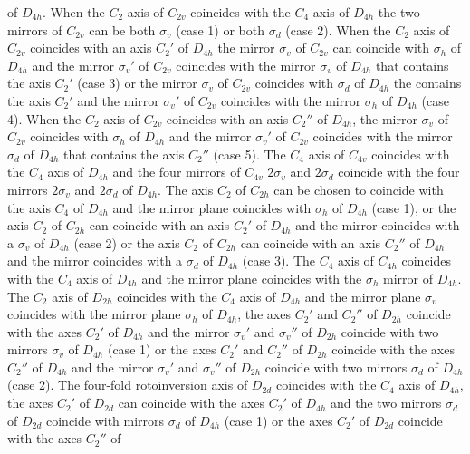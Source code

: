 \documentclass[12pt,a4paper]{article}
\begin{document}
of $D_{4h}$.
When the $C_2$ axis of $C_{2v}$ coincides with the $C_4$ axis
of $D_{4h}$ the two mirrors of $C_{2v}$ can be both $\sigma_v$ (case 1) or 
both $\sigma_d$ (case 2). When the $C_2$ axis of $C_{2v}$ coincides with an axis 
$C_2'$ of $D_{4h}$ the mirror $\sigma_v$ of $C_{2v}$ can coincide with $\sigma_h$ of
$D_{4h}$ and the mirror $\sigma_v'$ of $C_{2v}$ coincides with the mirror
$\sigma_v$ of $D_{4h}$ that contains the axis $C_2'$ (case 3) or the mirror
$\sigma_v$ of $C_{2v}$ coincides with $\sigma_d$ of
$D_{4h}$ the contains the axis $C_2'$ and the mirror $\sigma_v'$ of $C_{2v}$ 
coincides with the mirror $\sigma_h$ of $D_{4h}$ (case 4). 
When the $C_2$ axis of $C_{2v}$ coincides with an axis $C_2''$
of $D_{4h}$, the mirror $\sigma_v$ of $C_{2v}$ coincides with $\sigma_h$ 
of $D_{4h}$ and the mirror $\sigma_v'$ of $C_{2v}$ coincides with the
mirror $\sigma_d$ of $D_{4h}$ that contains the axis $C_2''$ (case 5). 
The $C_4$ axis of $C_{4v}$ coincides with the $C_4$ axis of $D_{4h}$
and the four mirrors of $C_{4v}$ $2\sigma_v$ and $2\sigma_d$
coincide with the four mirrors $2\sigma_v$ and $2\sigma_d$ of $D_{4h}$. 
The axis $C_2$ of $C_{2h}$ can be chosen to coincide with the 
axis $C_4$ of $D_{4h}$ and the mirror plane coincides with
$\sigma_h$ of $D_{4h}$ (case 1), or the axis $C_2$ of $C_{2h}$ can
coincide with an axis $C_2'$ of $D_{4h}$ and the mirror coincides with a 
$\sigma_v$ of $D_{4h}$ (case 2) or the axis $C_2$ of $C_{2h}$ can 
coincide with an axis $C_2''$ of $D_{4h}$ and the mirror coincides with a 
$\sigma_d$ of $D_{4h}$ (case 3). 
The $C_4$ axis of $C_{4h}$ coincides with the $C_4$ axis of $D_{4h}$ and
the mirror plane coincides with the $\sigma_h$ mirror of $D_{4h}$. 
The $C_2$ axis of $D_{2h}$ coincides with the $C_4$ axis of $D_{4h}$
and the mirror plane $\sigma_v$ coincides with the mirror plane $\sigma_h$
of $D_{4h}$, the axes $C_2'$ and $C_2''$ of $D_{2h}$ coincide with the 
axes $C_2'$ of $D_{4h}$ and the mirror $\sigma_v'$ and $\sigma_v''$ of $D_{2h}$
coincide with two mirrors $\sigma_v$ of $D_{4h}$ (case 1) or 
the axes $C_2'$ and $C_2''$ of $D_{2h}$ coincide with the axes $C_2''$ of
$D_{4h}$ and the mirror $\sigma_v'$ and $\sigma_v''$ of $D_{2h}$ 
coincide with two mirrors $\sigma_d$ of $D_{4h}$ (case 2).
The four-fold rotoinversion axis of $D_{2d}$ coincides with the $C_4$ axis of 
$D_{4h}$, the axes $C_2'$ of $D_{2d}$ can coincide with the 
axes $C_2'$ of $D_{4h}$ and the two mirrors $\sigma_d$ of $D_{2d}$
coincide with mirrors $\sigma_d$ of $D_{4h}$ (case 1) or 
the axes $C_2'$ of $D_{2d}$ coincide with the axes $C_2''$ of
\end{document}
